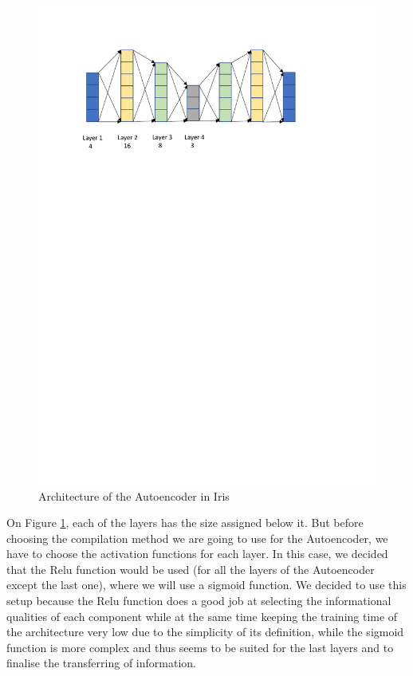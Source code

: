\begin{figure}[H]
	\centering
	\includegraphics[width=17cm]{Figuras_tfg/Autoencoder_Results}
	\caption{Architecture of the Autoencoder in Iris}
	\label{fig:figure_autoencoder_Iris}
\end{figure}

On Figure \ref{fig:figure_autoencoder_Iris}, each of the layers has the size assigned below it. But before choosing the compilation method we are going to use for the Autoencoder, we have to choose the activation functions for each layer. In this case, we decided that the Relu function would be used (for all the layers of the Autoencoder except the last one), where we will use a sigmoid function. We decided to use this setup because the Relu function does a good job at selecting the informational qualities of each component while at the same time keeping the training time of the architecture very low due to the simplicity of its definition, while the sigmoid function is more complex and thus seems to be suited for the last layers and to finalise the transferring of information. \par

